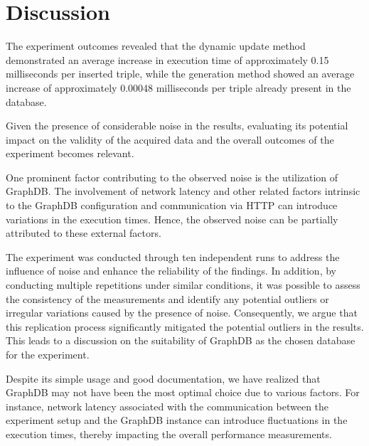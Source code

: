 \section{Discussion}\label{sec:discussion}
The experiment outcomes revealed that the dynamic update method demonstrated an average increase in execution time of approximately 0.15 milliseconds per inserted triple, while the generation method showed an average increase of approximately 0.00048 milliseconds per triple already present in the database.

Given the presence of considerable noise in the results, evaluating its potential impact on the validity of the acquired data and the overall outcomes of the experiment becomes relevant.

One prominent factor contributing to the observed noise is the utilization of GraphDB. The involvement of network latency and other related factors intrinsic to the GraphDB configuration and communication via HTTP can introduce variations in the execution times. Hence, the observed noise can be partially attributed to these external factors.

The experiment was conducted through ten independent runs to address the influence of noise and enhance the reliability of the findings. In addition, by conducting multiple repetitions under similar conditions, it was possible to assess the consistency of the measurements and identify any potential outliers or irregular variations caused by the presence of noise. Consequently, we argue that this replication process significantly mitigated the potential outliers in the results. This leads to a discussion on the suitability of GraphDB as the chosen database for the experiment.

Despite its simple usage and good documentation, we have realized that GraphDB may not have been the most optimal choice due to various factors. For instance, network latency associated with the communication between the experiment setup and the GraphDB instance can introduce fluctuations in the execution times, thereby impacting the overall performance measurements.